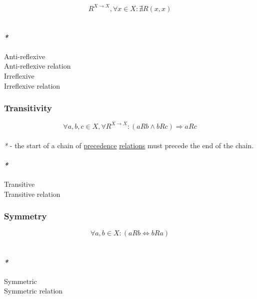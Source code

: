 \documentclass[11pt]{article}
\begin{document}
$$ R^{X \to X}, \forall x \in X : \nexists R(x, x) $$\\

\paragraph{\emph{*}}
\label{sec:orgf9e1091}

\label{orgddb2d3c}Anti-reflexive\\
\label{orge0d8f48}Anti-reflexive relation\\
\label{orge4e7a0b}Irreflexive\\
\label{orga0b8b93}Irreflexive relation\\

\subsubsection{\label{orgb97b9cd}Transitivity}
\label{sec:org2d16a02}

$$ \forall a,b,c \in X, \forall R^{X \to X} : (aRb \land bRc) \Rightarrow aRc $$\\

\emph{*} - the start of a chain of \hyperref[orgb0d1e87]{precedence} \hyperref[org711476e]{relations} must precede the end of the chain.\\

\paragraph{\emph{*}}
\label{sec:orgcb17303}

\label{org46b1759}Transitive\\
\label{org09ab1fc}Transitive relation\\

\subsubsection{\label{orgfb5b0f8}Symmetry}
\label{sec:orge50c172}

$$ \forall a,b \in X : (aRb \iff bRa) $$\\

\paragraph{\emph{*}}
\label{sec:org0218f5b}

\label{org63aee59}Symmetric\\
\label{orgf2e5731}Symmetric relation\\
\end{document}

